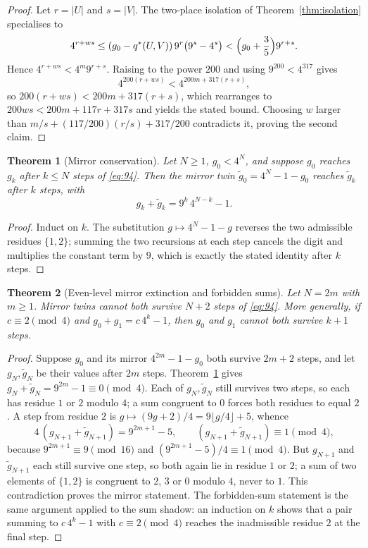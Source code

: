 \documentclass[11pt,a4paper]{article}
\newtheorem{theorem}{Theorem}[section]
\theoremstyle{remark}
\begin{document}
\begin{proof}
Let $r = |U|$ and $s = |V|$. The two-place isolation of Theorem~\ref{thm:isolation} specialises to
\[
  4^{r+ws} \le (g_{0} - q^{*}(U,V))\, 9^{r}\bigl(9^{s} - 4^{s}\bigr) < \Bigl(g_{0} + \frac35\Bigr) 9^{r+s}.
\]
Hence $4^{r+ws} < 4^{m} 9^{r+s}$. Raising to the power $200$ and using $9^{200} < 4^{317}$ gives
\[
  4^{200(r+ws)} < 4^{200m + 317(r+s)},
\]
so $200(r+ws) < 200m + 317(r+s)$, which rearranges to
$200ws < 200m + 117r + 317s$ and yields the stated bound. Choosing $w$ larger than $m/s + (117/200)(r/s) + 317/200$ contradicts it, proving the second claim.
\end{proof}

\begin{theorem}[Mirror conservation]
\label{thm:mirror}
Let $N \ge 1$, $g_{0} < 4^{N}$, and suppose $g_{0}$ reaches $g_{k}$ after $k \le N$ steps of \eqref{eq:94}. Then the mirror twin $\tilde g_{0} = 4^{N} - 1 - g_{0}$ reaches $\tilde g_{k}$ after $k$ steps, with
\[
  g_{k} + \tilde g_{k} = 9^{k}\, 4^{N-k} - 1.
\]
\end{theorem}

\begin{proof}
Induct on $k$. The substitution $g \mapsto 4^{N} - 1 - g$ reverses the two admissible residues $\{1,2\}$; summing the two recursions at each step cancels the digit and multiplies the constant term by $9$, which is exactly the stated identity after $k$ steps.
\end{proof}

\begin{theorem}[Even-level mirror extinction and forbidden sums]
\label{thm:evenlevel}
Let $N = 2m$ with $m \ge 1$. Mirror twins cannot both survive $N+2$ steps of \eqref{eq:94}. More generally, if $c \equiv 2 \pmod 4$ and $g_{0} + g_{1} = c\,4^{k} - 1$, then $g_{0}$ and $g_{1}$ cannot both survive $k+1$ steps.
\end{theorem}

\begin{proof}
Suppose $g_{0}$ and its mirror $4^{2m} - 1 - g_{0}$ both survive $2m+2$ steps, and let $g_{N}, \tilde g_{N}$ be their values after $2m$ steps. Theorem~\ref{thm:mirror} gives $g_{N} + \tilde g_{N} = 9^{2m} - 1 \equiv 0 \pmod 4$. Each of $g_{N}, \tilde g_{N}$ still survives two steps, so each has residue $1$ or $2$ modulo $4$; a sum congruent to $0$ forces both residues to equal $2$. A step from residue $2$ is $g \mapsto (9g+2)/4 = 9\lfloor g/4\rfloor + 5$, whence
\[
  4\,(g_{N+1} + \tilde g_{N+1}) = 9^{2m+1} - 5, \qquad
  (g_{N+1} + \tilde g_{N+1}) \equiv 1 \pmod 4,
\]
because $9^{2m+1} \equiv 9 \pmod{16}$ and $(9^{2m+1} - 5)/4 \equiv 1 \pmod 4$. But $g_{N+1}$ and $\tilde g_{N+1}$ each still survive one step, so both again lie in residue $1$ or $2$; a sum of two elements of $\{1,2\}$ is congruent to $2$, $3$ or $0$ modulo $4$, never to $1$. This contradiction proves the mirror statement. The forbidden-sum statement is the same argument applied to the sum shadow: an induction on $k$ shows that a pair summing to $c\,4^{k} - 1$ with $c \equiv 2 \pmod 4$ reaches the inadmissible residue $2$ at the final step.
\end{proof}
\end{document}
